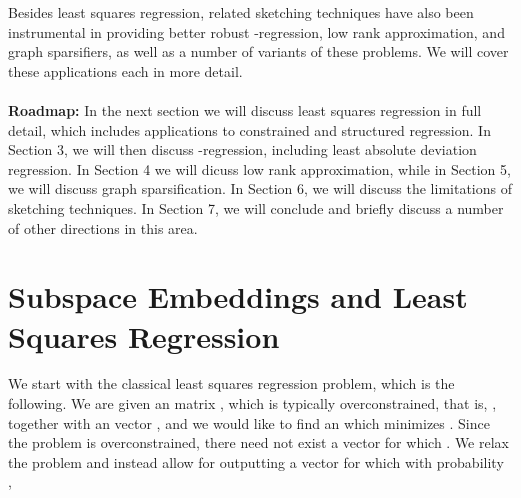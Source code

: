 \documentclass[11pt]{article}
\begin{document}
Besides least squares regression, related sketching techniques have also been 
instrumental in providing better robust -regression, low rank approximation, 
and graph sparsifiers, as well as a number of variants of these problems. 
We will cover these applications each in more detail. 
\\\\
{\bf Roadmap:} In the next section we will
discuss least squares regression in full detail, which includes applications to
constrained and structured regression. In Section 3, we will then 
discuss -regression, including least absolute deviation regression. In Section 4
we will dicuss low rank approximation, while in Section 5, we will discuss graph sparsification. 
In Section 6, we will discuss the limitations of sketching techniques. In Section 7, 
we will conclude and briefly discuss a number of other directions in this area.

\section{Subspace Embeddings and Least Squares Regression}
We start with the classical least squares regression problem, which is the following. We are
given an  matrix , which is typically overconstrained, that is, , together
with an  vector , and we would like to find an  
which minimizes . Since the
problem is overconstrained, there need not exist a vector  for which . We
relax the problem and instead allow for outputting a vector  for which with probability , 
\end{document}
